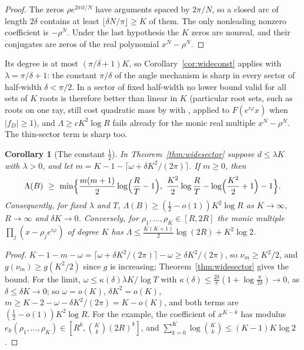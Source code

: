 \documentclass[11pt]{article}
\newtheorem{corollary}[theorem]{Corollary}
\begin{document}
\begin{proof}
The zeros $\rho e^{2\pi il/N}$ have arguments spaced by $2\pi/N$, so a closed
arc of length $2\delta$ contains at least $\lfloor\delta N/\pi\rfloor\ge K$ of
them.  The only nonleading nonzero coefficient is $-\rho^N$.  Under the last
hypothesis the $K$ zeros are nonreal, and their conjugates are zeros of the
real polynomial $x^N-\rho^N$.
\end{proof}

Its degree is at most $(\pi/\delta+1)K$, so Corollary~\ref{cor:wideconst}
applies with $\lambda=\pi/\delta+1$: the constant $\pi/\delta$ of the angle
mechanism is sharp in every sector of half-width $\delta<\pi/2$.  In a sector of fixed half-width no
lower bound valid for all sets of $K$ roots is therefore better than linear
in $K$ (particular root sets, such as roots on one ray, still cost
quadratic mass by \cite[Corollary~2.4]{coefficient-mass-complex} with
\cite[Corollary~3.4]{coefficient-mass}, applied to $F(e^{i\varphi}x)$ when
$|f_D|\ge1$), and $\Lambda\ge cK^2\log R$ fails already
for the monic real multiple $x^N-\rho^N$.  The thin-sector term is sharp too.

\begin{corollary}[The constant $\frac12$]\label{cor:thinconst}
In Theorem~\ref{thm:widesector} suppose $d\le\lambda K$ with $\lambda>0$, and
let $m=K-1-\lceil\omega+\delta K^2/(2\pi)\rceil$.  If $m\ge0$, then
\[
  \Lambda(B)\ \ge\ \min\Bigl\{\frac{m(m+1)}2\log\Bigl(\frac RT-1\Bigr),\
  \frac{K^2}2\log\frac RT-\log\Bigl(\frac{K^2}2+1\Bigr)-1\Bigr\}.
\]
Consequently, for fixed $\lambda$ and $T$, $\Lambda(B)\ge(\frac12-o(1))K^2\log R$
as $K\to\infty$, $R\to\infty$ and $\delta K\to0$.  Conversely, for
$\rho_1,\ldots,\rho_K\in[R,2R]$ the monic multiple
$\prod_j(x-\rho_je^{i\varphi})$ of degree $K$ has
$\Lambda\le\frac{K(K+1)}2\log(2R)+K^2\log2$.
\end{corollary}

\begin{proof}
$K-1-m-\omega=\lceil\omega+\delta K^2/(2\pi)\rceil-\omega\ge\delta K^2/(2\pi)$,
so $\nu_m\ge K^2/2$, and $g(\nu_m)\ge g(K^2/2)$ since $g$ is increasing;
Theorem~\ref{thm:widesector} gives the bound.  For the limit,
$\omega\le\kappa(\delta)\lambda K/\log T$ with
$\kappa(\delta)\le\frac{2\delta}\pi(1+\log\frac\pi{2\delta})\to0$, as
$\delta\le\delta K\to0$; so $\omega=o(K)$, $\delta K^2=o(K)$,
$m\ge K-2-\omega-\delta K^2/(2\pi)=K-o(K)$, and both terms are
$(\frac12-o(1))K^2\log R$.  For the example, the coefficient of
$x^{K-k}$ has modulus $e_k(\rho_1,\ldots,\rho_K)\in[R^k,\binom Kk(2R)^k]$,
and $\sum_{k=0}^K\log\binom Kk\le(K-1)K\log2$.
\end{proof}
\end{document}
